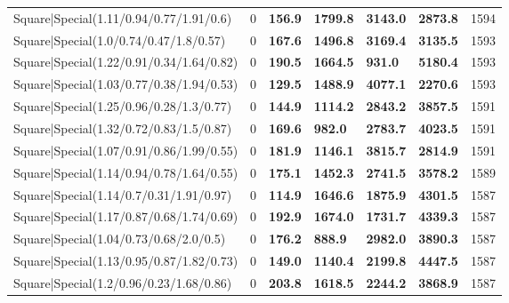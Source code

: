 \begin{tabular}{lrllllr}
 Square|Special(1.11/0.94/0.77/1.91/0.6)                       &             0   & \textbf{156.9} & \textbf{1799.8} & \textbf{3143.0} & \textbf{2873.8} &         1594 \\
 Square|Special(1.0/0.74/0.47/1.8/0.57)                        &             0   & \textbf{167.6} & \textbf{1496.8} & \textbf{3169.4} & \textbf{3135.5} &         1593 \\
 Square|Special(1.22/0.91/0.34/1.64/0.82)                      &             0   & \textbf{190.5} & \textbf{1664.5} & \textbf{931.0}  & \textbf{5180.4} &         1593 \\
 Square|Special(1.03/0.77/0.38/1.94/0.53)                      &             0   & \textbf{129.5} & \textbf{1488.9} & \textbf{4077.1} & \textbf{2270.6} &         1593 \\
 Square|Special(1.25/0.96/0.28/1.3/0.77)                       &             0   & \textbf{144.9} & \textbf{1114.2} & \textbf{2843.2} & \textbf{3857.5} &         1591 \\
 Square|Special(1.32/0.72/0.83/1.5/0.87)                       &             0   & \textbf{169.6} & \textbf{982.0}  & \textbf{2783.7} & \textbf{4023.5} &         1591 \\
 Square|Special(1.07/0.91/0.86/1.99/0.55)                      &             0   & \textbf{181.9} & \textbf{1146.1} & \textbf{3815.7} & \textbf{2814.9} &         1591 \\
 Square|Special(1.14/0.94/0.78/1.64/0.55)                      &             0   & \textbf{175.1} & \textbf{1452.3} & \textbf{2741.5} & \textbf{3578.2} &         1589 \\
 Square|Special(1.14/0.7/0.31/1.91/0.97)                       &             0   & \textbf{114.9} & \textbf{1646.6} & \textbf{1875.9} & \textbf{4301.5} &         1587 \\
 Square|Special(1.17/0.87/0.68/1.74/0.69)                      &             0   & \textbf{192.9} & \textbf{1674.0} & \textbf{1731.7} & \textbf{4339.3} &         1587 \\
 Square|Special(1.04/0.73/0.68/2.0/0.5)                        &             0   & \textbf{176.2} & \textbf{888.9}  & \textbf{2982.0} & \textbf{3890.3} &         1587 \\
 Square|Special(1.13/0.95/0.87/1.82/0.73)                      &             0   & \textbf{149.0} & \textbf{1140.4} & \textbf{2199.8} & \textbf{4447.5} &         1587 \\
 Square|Special(1.2/0.96/0.23/1.68/0.86)                       &             0   & \textbf{203.8} & \textbf{1618.5} & \textbf{2244.2} & \textbf{3868.9} &         1587 \\

\end{tabular}
